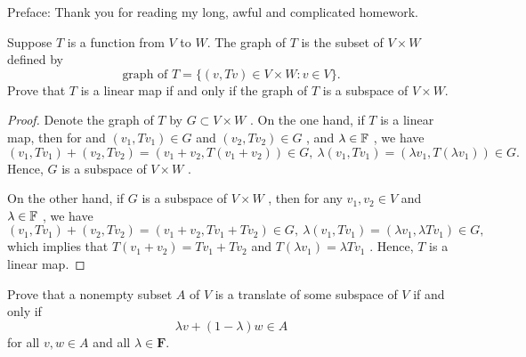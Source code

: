 \documentclass{article}
\begin{document}
Preface: Thank you for reading my long, awful and complicated homework.

\begin{problem}[3E-1]
	Suppose $T$ is a function from $V$ to $W$. The graph of $T$ is the subset of
	$V \times W$ defined by
	\[
		\text{graph of }T
		= \{(v, Tv) \in V \times W : v \in V\}.
	\]
	Prove that $T$ is a linear map if and only if the graph of $T$ is a subspace
	of $V \times W$.
\end{problem}

\begin{proof}
	Denote the graph of \( T \) by \( G\subset V\times W \) . On the one hand, if \( T \) is a linear map, then for and \( (v_1,Tv_1)\in G \) and  \( (v_2,Tv_2)\in G \) , and  \( \lambda\in\mathbb{F} \) , we have
	\[ (v_1,Tv_1)+(v_2,Tv_2)=(v_1+v_2,T(v_1+v_2))\in G,\ \lambda(v_1,Tv_1)=(\lambda v_1,T(\lambda v_1))\in G. \] 
	Hence, \( G \) is a subspace of \( V\times W \) .\par
	On the other hand, if \( G \) is a subspace of \( V\times W \) , then for any \( v_1,v_2\in V \) and \( \lambda\in\mathbb{F} \) , we have
	\[ (v_1,Tv_1)+(v_2,Tv_2)=(v_1+v_2,Tv_1+Tv_2)\in G,\ \lambda(v_1,Tv_1)=(\lambda v_1,\lambda Tv_1)\in G, \]
	which implies that \( T(v_1+v_2)=Tv_1+Tv_2 \) and \( T(\lambda v_1)=\lambda Tv_1 \) . Hence, \( T \) is a linear map.
\end{proof}

\begin{problem}[3E-9]
	Prove that a nonempty subset $A$ of $V$ is a translate of some subspace of
	$V$ if and only if
	\[
		\lambda v + (1 - \lambda)w \in A
	\]
	for all $v, w \in A$ and all $\lambda \in \mathbf{F}$.
\end{problem}
\end{document}
